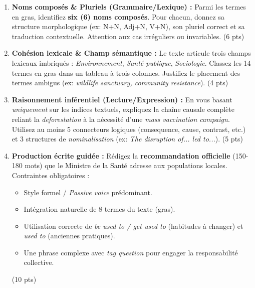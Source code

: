 \documentclass[11pt]{article}
\begin{document}
\begin{exercice}
\begin{enumerate}
    \item \textbf{Noms composés \& Pluriels (Grammaire/Lexique) :} Parmi les termes en gras, identifiez \textbf{six (6) noms composés}. Pour chacun, donnez sa structure morphologique (ex: N+N, Adj+N, V+N), son pluriel correct et sa traduction contextuelle. Attention aux cas irréguliers ou invariables. (6 pts)
    \item \textbf{Cohésion lexicale \& Champ sémantique :} Le texte articule trois champs lexicaux imbriqués : \textit{Environnement}, \textit{Santé publique}, \textit{Sociologie}. Classez les 14 termes en gras dans un tableau à trois colonnes. Justifiez le placement des termes ambigus (ex: \textit{wildlife sanctuary, community resistance}). (4 pts)
    \item \textbf{Raisonnement inférentiel (Lecture/Expression) :} En vous basant \textit{uniquement} sur les indices textuels, expliquez la chaîne causale complète reliant la \textit{deforestation} à la nécessité d'une \textit{mass vaccination campaign}. Utilisez au moins 5 connecteurs logiques (consequence, cause, contrast, etc.) et 3 structures de \textit{nominalisation} (ex: \textit{The disruption of... led to...}). (5 pts)
    \item \textbf{Production écrite guidée :} Rédigez la \textbf{recommandation officielle} (150-180 mots) que le Ministre de la Santé adresse aux populations locales. Contraintes obligatoires :
    \begin{itemize}
        \item Style formel / \textit{Passive voice} prédominant.
        \item Intégration naturelle de 8 termes du texte (gras).
        \item Utilisation correcte de \textit{be used to / get used to} (habitudes à changer) et \textit{used to} (anciennes pratiques).
        \item Une phrase complexe avec \textit{tag question} pour engager la responsabilité collective.
    \end{itemize}
    (10 pts)
\end{enumerate}
\end{exercice}
\end{document}

